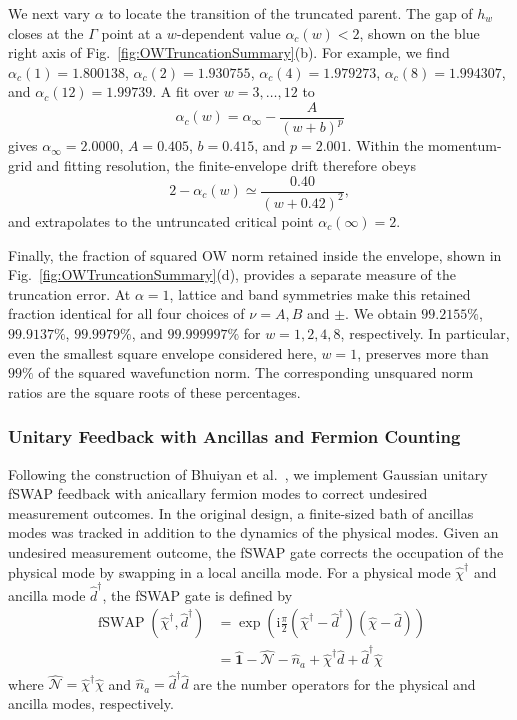 \documentclass[aps,prb,twocolumn,superscriptaddress,longbibliography,floatfix]{revtex4-2}
\newcommand{\ii}{\mathrm{i}}
\newcommand{\mc}[1]{\mathcal{#1}}
\newcommand{\Id}{\mathbf{1}}
\newcommand{\fSWAP}{\operatorname{fSWAP}}
\theoremstyle{plain}
\theoremstyle{definition}
\theoremstyle{remark}
\begin{document}
We next vary $\alpha$ to locate the transition of the truncated parent. The gap of $h_w$ closes at the $\Gamma$ point at a $w$-dependent value $\alpha_c(w)<2$, shown on the blue right axis of Fig.~\ref{fig:OWTruncationSummary}(b). For example, we find $\alpha_c(1)=1.800138$, $\alpha_c(2)=1.930755$, $\alpha_c(4)=1.979273$, $\alpha_c(8)=1.994307$, and $\alpha_c(12)=1.99739$. A fit over $w=3,\ldots,12$ to
\begin{equation}
    \alpha_c(w)
    =
    \alpha_\infty-\frac{A}{(w+b)^p}
    \label{eq:TruncatedCriticalFit}
\end{equation}
gives $\alpha_\infty=2.0000$, $A=0.405$, $b=0.415$, and $p=2.001$. Within the momentum-grid and fitting resolution, the finite-envelope drift therefore obeys
\begin{equation}
    2-\alpha_c(w)
    \simeq
    \frac{0.40}{(w+0.42)^2},
    \label{eq:TruncatedCriticalDrift}
\end{equation}
and extrapolates to the untruncated critical point $\alpha_c(\infty)=2$.

Finally, the fraction of squared OW norm retained inside the envelope, shown in Fig.~\ref{fig:OWTruncationSummary}(d), provides a separate measure of the truncation error. At $\alpha=1$, lattice and band symmetries make this retained fraction identical for all four choices of $\nu=A,B$ and $\pm$. We obtain $99.2155\%$, $99.9137\%$, $99.9979\%$, and $99.999997\%$ for $w=1,2,4,8$, respectively. In particular, even the smallest square envelope considered here, $w=1$, preserves more than $99\%$ of the squared wavefunction norm. The corresponding unsquared norm ratios are the square roots of these percentages.

\subsubsection{Unitary Feedback with Ancillas and Fermion Counting}
Following the construction of Bhuiyan et al.~\cite{BhuiyanPanJian2026}, we implement Gaussian unitary fSWAP feedback with anicallary fermion modes to correct undesired measurement outcomes. In the original design, a finite-sized bath of ancillas modes was tracked in addition to the dynamics of the physical modes. Given an undesired measurement outcome, the fSWAP gate corrects the occupation of the physical mode by swapping in a local ancilla mode. For a physical mode $\hat{\chi}^\dagger$ and ancilla mode $\hat{d}^\dagger$, the fSWAP gate is defined by
\begin{align}
    \fSWAP(\hat{\chi}^\dagger,\hat{d}^\dagger)
    &= \exp\left(\ii\frac{\pi}{2}(\hat{\chi}^\dagger-\hat{d}^\dagger)(\hat{\chi}-\hat{d})\right)\\
    &=
    \hat{\Id}-\hat{\mc{N}}-\hat{n}_a
    +\hat{\chi}^\dagger \hat{d}+\hat{d}^\dagger\hat{\chi}
    \label{eq:fSWAP}
\end{align}
where $\hat{\mc{N}}=\hat{\chi}^\dagger\hat{\chi}$ and $\hat{n}_a=\hat{d}^\dagger\hat{d}$ are the number operators for the physical and ancilla modes, respectively. 
\end{document}
